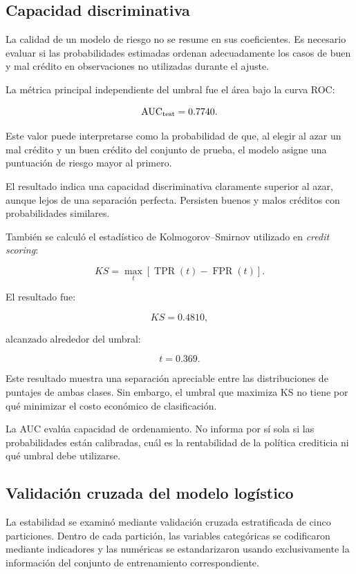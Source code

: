 \subsection{Capacidad discriminativa}

La calidad de un modelo de riesgo no se resume en sus coeficientes. Es
necesario evaluar si las probabilidades estimadas ordenan adecuadamente
los casos de buen y mal crédito en observaciones no utilizadas durante
el ajuste.

La métrica principal independiente del umbral fue el área bajo la curva
ROC:

\[
\mathrm{AUC}_{\mathrm{test}}
=
0.7740.
\]

Este valor puede interpretarse como la probabilidad de que, al elegir al
azar un mal crédito y un buen crédito del conjunto de prueba, el modelo
asigne una puntuación de riesgo mayor al primero.

El resultado indica una capacidad discriminativa claramente superior al
azar, aunque lejos de una separación perfecta. Persisten buenos y malos
créditos con probabilidades similares.

También se calculó el estadístico de Kolmogorov--Smirnov utilizado en
\textit{credit scoring}:

\[
KS
=
\max_t
\left[
    \operatorname{TPR}(t)
    -
    \operatorname{FPR}(t)
\right].
\]

El resultado fue:

\[
KS=0.4810,
\]

alcanzado alrededor del umbral:

\[
t=0.369.
\]

Este resultado muestra una separación apreciable entre las distribuciones
de puntajes de ambas clases. Sin embargo, el umbral que maximiza KS no
tiene por qué minimizar el costo económico de clasificación.

La AUC evalúa capacidad de ordenamiento. No informa por sí sola si las
probabilidades están calibradas, cuál es la rentabilidad de la política
crediticia ni qué umbral debe utilizarse.

\subsection{Validación cruzada del modelo logístico}

La estabilidad se examinó mediante validación cruzada estratificada de
cinco particiones. Dentro de cada partición, las variables categóricas se
codificaron mediante indicadores y las numéricas se estandarizaron usando
exclusivamente la información del conjunto de entrenamiento
correspondiente.

